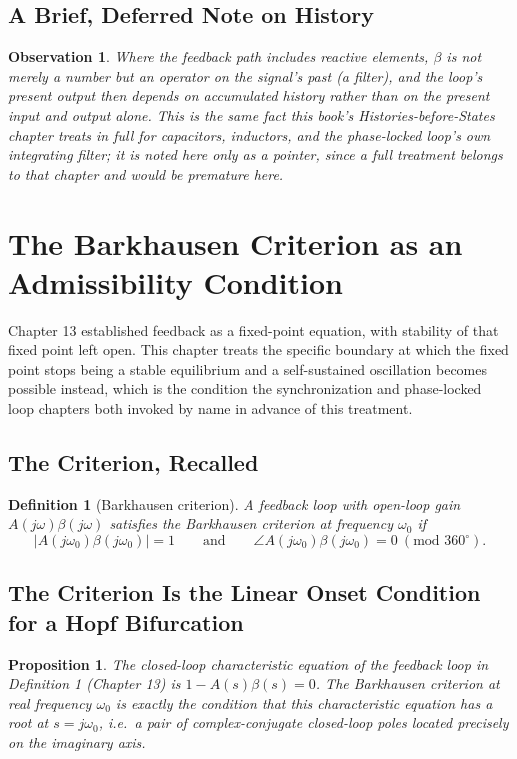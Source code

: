 \documentclass[12pt]{article}
\newtheorem{definition}{Definition}
\newtheorem{proposition}{Proposition}
\newtheorem{observation}{Observation}
\begin{document}
\subsection{A Brief, Deferred Note on History}

\begin{observation}
Where the feedback path includes reactive elements, $\beta$ is not merely a number but an operator on the signal's past (a filter), and the loop's present output then depends on accumulated history rather than on the present input and output alone. This is the same fact this book's Histories-before-States chapter treats in full for capacitors, inductors, and the phase-locked loop's own integrating filter; it is noted here only as a pointer, since a full treatment belongs to that chapter and would be premature here.
\end{observation}

\section{The Barkhausen Criterion as an Admissibility Condition}

Chapter 13 established feedback as a fixed-point equation, with stability of that fixed point left open. This chapter treats the specific boundary at which the fixed point stops being a stable equilibrium and a self-sustained oscillation becomes possible instead, which is the condition the synchronization and phase-locked loop chapters both invoked by name in advance of this treatment.

\subsection{The Criterion, Recalled}

\begin{definition}[Barkhausen criterion]
A feedback loop with open-loop gain $A(j\omega)\beta(j\omega)$ satisfies the Barkhausen criterion at frequency $\omega_0$ if
\[
|A(j\omega_0)\beta(j\omega_0)| = 1 \qquad \text{and} \qquad \angle A(j\omega_0)\beta(j\omega_0) = 0 \ (\text{mod } 360^\circ).
\]
\end{definition}

\subsection{The Criterion Is the Linear Onset Condition for a Hopf Bifurcation}

\begin{proposition}
The closed-loop characteristic equation of the feedback loop in Definition 1 (Chapter 13) is $1 - A(s)\beta(s) = 0$. The Barkhausen criterion at real frequency $\omega_0$ is exactly the condition that this characteristic equation has a root at $s = j\omega_0$, i.e.\ a pair of complex-conjugate closed-loop poles located precisely on the imaginary axis.
\end{proposition}
\end{document}
